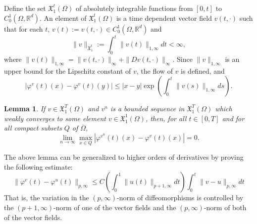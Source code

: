 \documentclass[a5paper,10pt,twoside]{article}
\newcommand{\R}{\ensuremath{\mathbb{R}}}
\newcommand{\X}{\ensuremath{\mathfrak{X}}}
\theoremstyle{plain}
\newtheorem{lem}[teo]{Lemma}
\theoremstyle{definition}
\theoremstyle{remark}
\begin{document}
Define the set $\X_1^t(\Omega)$ of absolutely integrable functions from $[0,t]$ to $C_0^1(\Omega,\R^d)$. An element of $\X_1^t(\Omega)$ is a time dependent vector field $v(t,\cdot)$ such that for each $t$, $v(t):=v(t,\cdot)\in C_0^1(\Omega,\R^d)$ and
\[
\|v\|_{\X_1^t}:=\int_0^t\|v(t)\|_{1,\infty}dt<\infty,
\]
where $\|v(t)\|_{1,\infty}=\|v(t,\cdot)\|_\infty+\|Dv(t,\cdot)\|_\infty$. Since $\|v\|_{1,\infty}$ is an upper bound for the Lipschitz constant of $v$, the flow of $v$ is defined, and
%
\begin{equation}
\label{eq:phi-Lipschitz}
|\varphi^v(t)(x)-\varphi^v(t)(y)|\leq |x-y|\exp\left(\int_0^t\|v(s)\|_{1,\infty}ds\right).
\end{equation}

\begin{lem}\label{pointwise}
	If $v\in\X_1^T(\Omega)$ and $v^n$ is a bounded sequence in $\X_1^T(\Omega)$ which weakly converges to some element $v\in\X_1^1(\Omega)$, then, for all $t\in[0,T]$ and for all compact subsets $Q$ of $\overline{\Omega}$,
	\[
	\lim_{n\to\infty}\max_{x\in Q}\left|\varphi^{v^n}(t)(x)-\varphi^{v}(t)(x)\right|=0.
	\]
\end{lem}
The above lemma can be generalized to higher orders of derivatives by proving the following estimate:
%
\begin{equation} 
\label{eq:estimate}
\|\varphi^v(t)-\varphi^{u}(t)\|_{p,\infty}\leq C\left(\int_0^1\|u(t)\|_{p+1,\infty}dt\right)\int_0^t\|v-u\|_{p,\infty} dt
\end{equation}
%
That is, the variation in the $(p,\infty)$-norm of diffeomorphisms is controlled by the $(p+1,\infty)$-norm of one of the vector fields and the $(p,\infty)$-norm of both of the vector fields.
\end{document}
